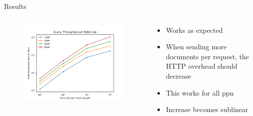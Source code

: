 \documentclass[compress,aspectratio=169]{beamer}
\begin{document}
  \begin{frame}{Results}
    \begin{columns}
      \begin{column}{0.5\textwidth}
        \begin{figure}
          \includegraphics[height=0.9\textwidth]{./analysis/querythroughput.png}
        \end{figure}
      \end{column}
      \begin{column}{0.5\textwidth}
        \begin{itemize}
          \item Works as expected
          \item When sending more documents per request, the HTTP overhead should decrease
          \item This works for all ppn
          \item Increase becomes sublinear
        \end{itemize}
      \end{column}
    \end{columns}
  \end{frame}
\end{document}
